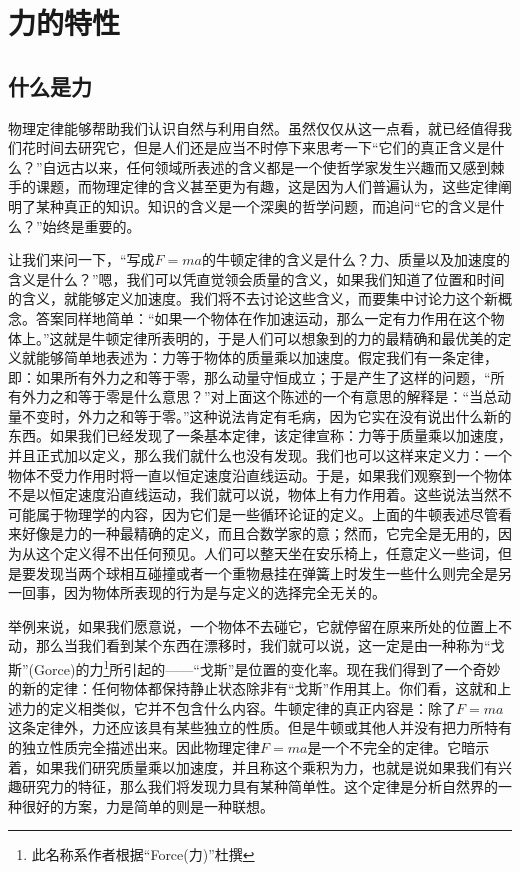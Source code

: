 \chapter{力的特性}

\section{什么是力}

物理定律能够帮助我们认识自然与利用自然。虽然仅仅从这一点看，就已经值得我们花时间去研究它，但是人们还是应当不时停下来思考一下“它们的真正含义是什么？”自远古以来，任何领域所表述的含义都是一个使哲学家发生兴趣而又感到棘手的课题，而物理定律的含义甚至更为有趣，这是因为人们普遍认为，这些定律阐明了某种真正的知识。知识的含义是一个深奥的哲学问题，而追问“它的含义是什么？”始终是重要的。

让我们来问一下，“写成$F=ma$的牛顿定律的含义是什么？力、质量以及加速度的含义是什么？”嗯，我们可以凭直觉领会质量的含义，如果我们知道了位置和时间的含义，就能够定义加速度。我们将不去讨论这些含义，而要集中讨论力这个新概念。答案同样地简单：“如果一个物体在作加速运动，那么一定有力作用在这个物体上。”这就是牛顿定律所表明的，于是人们可以想象到的力的最精确和最优美的定义就能够简单地表述为：力等于物体的质量乘以加速度。假定我们有一条定律，即：如果所有外力之和等于零，那么动量守恒成立；于是产生了这样的问题，“所有外力之和等于零是什么意思？”对上面这个陈述的一个有意思的解释是：“当总动量不变时，外力之和等于零。”这种说法肯定有毛病，因为它实在没有说出什么新的东西。如果我们已经发现了一条基本定律，该定律宣称：力等于质量乘以加速度，并且正式加以定义，那么我们就什么也没有发现。我们也可以这样来定义力：一个物体不受力作用时将一直以恒定速度沿直线运动。于是，如果我们观察到一个物体不是以恒定速度沿直线运动，我们就可以说，物体上有力作用着。这些说法当然不可能属于物理学的内容，因为它们是一些循环论证的定义。上面的牛顿表述尽管看来好像是力的一种最精确的定义，而且合数学家的意；然而，它完全是无用的，因为从这个定义得不出任何预见。人们可以整天坐在安乐椅上，任意定义一些词，但是要发现当两个球相互碰撞或者一个重物悬挂在弹簧上时发生一些什么则完全是另一回事，因为物体所表现的行为是与定义的选择完全无关的。

举例来说，如果我们愿意说，一个物体不去碰它，它就停留在原来所处的位置上不动，那么当我们看到某个东西在漂移时，我们就可以说，这一定是由一种称为“戈斯”(Gorce)的力\footnote{此名称系作者根据“Force(力)”杜撰}所引起的——“戈斯”是位置的变化率。现在我们得到了一个奇妙的新的定律：任何物体都保持静止状态除非有“戈斯”作用其上。你们看，这就和上述力的定义相类似，它并不包含什么内容。牛顿定律的真正内容是：除了$F=ma$这条定律外，力还应该具有某些独立的性质。但是牛顿或其他人并没有把力所特有的独立性质完全描述出来。因此物理定律$F=ma$是一个不完全的定律。它暗示着，如果我们研究质量乘以加速度，并且称这个乘积为力，也就是说如果我们有兴趣研究力的特征，那么我们将发现力具有某种简单性。这个定律是分析自然界的一种很好的方案，力是简单的则是一种联想。

